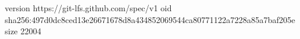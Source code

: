 version https://git-lfs.github.com/spec/v1
oid sha256:497d0dc8ced13e26671678d8a434852069544ca80771122a7228a85a7baf205e
size 22004
